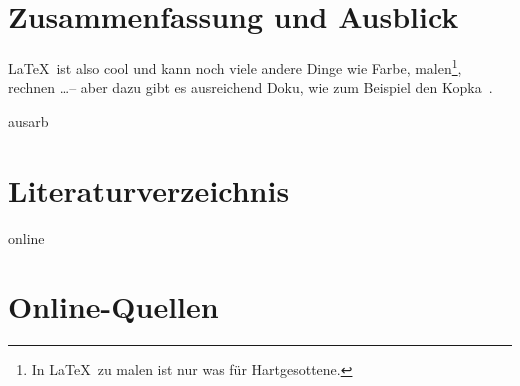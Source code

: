 \documentclass[11pt,a4paper]{article} %
\begin{document}
\section{Zusammenfassung und Ausblick}

\LaTeX\ ist also cool und kann noch viele andere Dinge wie Farbe,
malen\footnote{In \LaTeX\ zu malen ist nur was für Hartgesottene.},
rechnen \ldots -- aber dazu gibt es ausreichend Doku, 
wie zum Beispiel den Kopka~\cite{kopka}.



\newpage

\listoffigures %
\listoftables %

\newpage


%

\begin{btSect}{ausarb}
\section*{Literaturverzeichnis}
\btPrintCited
\end{btSect}
\begin{btSect}{online}
\section*{Online-Quellen}
\btPrintCited
\end{btSect}
\end{document}
